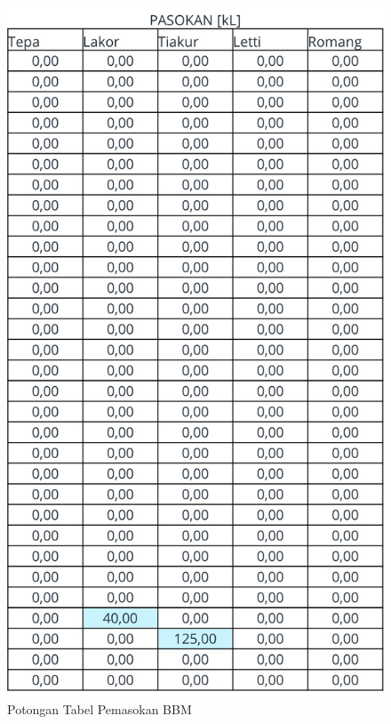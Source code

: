 \begin{figure}[!ht]
    \centering
    \includegraphics[width=\linewidth,height=\textheight,keepaspectratio]{lampiran/tabel-pasokan-simu.jpg}
    \caption*{Potongan Tabel Pemasokan BBM}
\end{figure}

